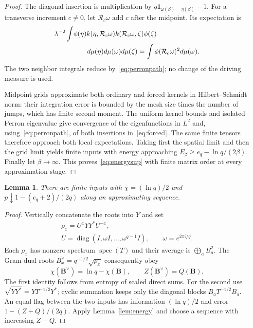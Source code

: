 \documentclass[12pt,letterpaper,onecolumn]{article}
\newtheorem{lemma}[theorem]{Lemma}
\DeclareMathOperator{\diag}{diag}
\DeclareMathOperator{\spec}{spec}
\newcommand{\one}{\mathbf 1}
\begin{document}
\begin{proof}
The diagonal insertion is multiplication by
$q\one_{\omega(\beta)=\eta(\beta)}-1$.
For a transverse increment $c\ne0$, let $\mathcal R_c\omega$ add $c$ after the midpoint. Its expectation is
\begin{align}
\lambda^{-2}\int&\phi(\eta)k(\eta,\mathcal R_c\omega)
k(\mathcal R_c\omega,\zeta)\phi(\zeta)\notag\\
&\hspace{7mm}d\mu(\eta)d\mu(\omega)d\mu(\zeta)
=\int\phi(\mathcal R_c\omega)^2d\mu(\omega).\label{eq:forced}
\end{align}
The two neighbor integrals reduce by~\eqref{eq:perronpath}; no change of the driving measure is used.

Midpoint grids approximate both ordinary and forced kernels in Hilbert--Schmidt norm: their integration error is bounded by the mesh size times the number of jumps, which has finite second moment. The uniform kernel bounds and isolated Perron eigenvalue give convergence of the eigenfunctions in $L^2$ and, using~\eqref{eq:perronpath}, of both insertions in~\eqref{eq:forced}. The same finite tensors therefore approach both local expectations. Taking first the spatial limit and then the grid limit yields finite inputs with energy approaching $E_\beta\ge e_q-\ln q/(2\beta)$. Finally let $\beta\to\infty$. This proves~\eqref{eq:energysup} with finite matrix order at every approximation stage.
\end{proof}

\begin{lemma}\label{lem:gram}
There are finite inputs with $\chi=(\ln q)/2$ and $p\downarrow 1-(e_q+2)/(2q)$ along an approximating sequence.
\end{lemma}
\begin{proof}
Vertically concatenate the roots into $Y$ and set
\begin{gather*}
\rho_x=U^xYY^*U^{-x},\\
U=\diag(I,\omega I,\ldots,\omega^{q-1}I),\qquad \omega=e^{2\pi i/q}.
\end{gather*}
Each $\rho_x$ has nonzero spectrum $\spec(T)$ and their average is $\bigoplus_aB_a^2$. The Gram-dual roots
$B_x^\vee=q^{-1/2}\sqrt{\rho_x}$ consequently obey
\begin{equation}\label{eq:gram}
\chi(\boldsymbol B^\vee)=\ln q-\chi(\boldsymbol B),\qquad
Z(\boldsymbol B^\vee)=Q(\boldsymbol B).
\end{equation}
The first identity follows from entropy of scaled direct sums. For the second use $\sqrt{YY^*}=YT^{-1/2}Y^*$; cyclic summation keeps only the diagonal blocks $B_aT^{-1/2}B_a$. An equal flag between the two inputs has information $(\ln q)/2$ and error $1-(Z+Q)/(2q)$. Apply Lemma~\ref{lem:energy} and choose a sequence with increasing $Z+Q$.
\end{proof}
\end{document}

